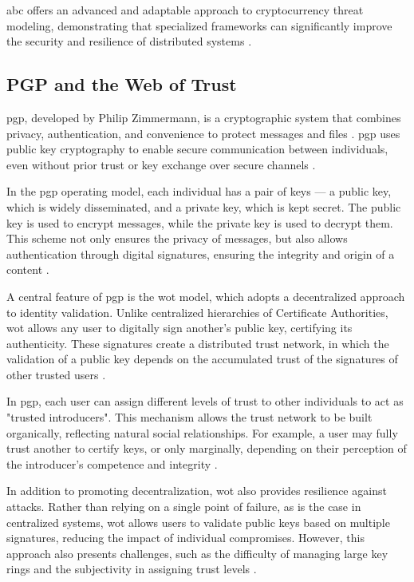 \gls{abc} offers an advanced and adaptable approach to cryptocurrency threat
modeling, demonstrating that specialized frameworks can significantly improve
the security and resilience of distributed systems \cite{AbcCrypto}.

\subsection{PGP and the Web of Trust}
\label{subsec:pgp_web_of_trust}

\gls{pgp}, developed by Philip Zimmermann, is a cryptographic system that
combines privacy, authentication, and convenience to protect messages and files
\cite{Pgp}. \gls{pgp} uses public key cryptography to enable secure
communication between individuals, even without prior trust or key exchange over
secure channels \cite{Pgp}.

In the \gls{pgp} operating model, each individual has a pair of keys — a public
key, which is widely disseminated, and a private key, which is kept secret. The
public key is used to encrypt messages, while the private key is used to decrypt
them. This scheme not only ensures the privacy of messages, but also allows
authentication through digital signatures, ensuring the integrity and origin of
a content \cite{Pgp}.

A central feature of \gls{pgp} is the \gls{wot} model, which adopts a
decentralized approach to identity validation. Unlike centralized hierarchies of
Certificate Authorities, \gls{wot} allows any user to digitally sign another's
public key, certifying its authenticity. These signatures create a distributed
trust network, in which the validation of a public key depends on the
accumulated trust of the signatures of other trusted users \cite{Pgp}.

In \gls{pgp}, each user can assign different levels of trust to other
individuals to act as "trusted introducers". This mechanism allows the trust
network to be built organically, reflecting natural social relationships. For
example, a user may fully trust another to certify keys, or only marginally,
depending on their perception of the introducer's competence and integrity
\cite{Pgp}.

In addition to promoting decentralization, \gls{wot} also provides resilience
against \cite{Pgp} attacks. Rather than relying on a single point of failure, as
is the case in centralized systems, \gls{wot} allows users to validate public
keys based on multiple signatures, reducing the impact of individual
compromises. However, this approach also presents challenges, such as the
difficulty of managing large key rings and the subjectivity in assigning trust
levels \cite{Pgp}.

